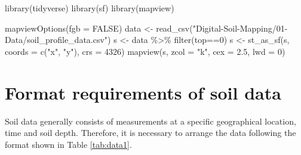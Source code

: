 \documentclass[
  10pt,
  b5paper,
  oneside]{book}
\newenvironment{Shaded}{\begin{snugshade}}{\end{snugshade}}
\newcommand{\AttributeTok}[1]{\textcolor[rgb]{0.77,0.63,0.00}{#1}}
\newcommand{\ConstantTok}[1]{\textcolor[rgb]{0.00,0.00,0.00}{#1}}
\newcommand{\DecValTok}[1]{\textcolor[rgb]{0.00,0.00,0.81}{#1}}
\newcommand{\FloatTok}[1]{\textcolor[rgb]{0.00,0.00,0.81}{#1}}
\newcommand{\FunctionTok}[1]{\textcolor[rgb]{0.00,0.00,0.00}{#1}}
\newcommand{\NormalTok}[1]{#1}
\newcommand{\OtherTok}[1]{\textcolor[rgb]{0.56,0.35,0.01}{#1}}
\newcommand{\SpecialCharTok}[1]{\textcolor[rgb]{0.00,0.00,0.00}{#1}}
\newcommand{\StringTok}[1]{\textcolor[rgb]{0.31,0.60,0.02}{#1}}
\begin{document}
\begin{Shaded}
\begin{Highlighting}[]
\FunctionTok{library}\NormalTok{(tidyverse)}
\FunctionTok{library}\NormalTok{(sf)}
\FunctionTok{library}\NormalTok{(mapview)}

\FunctionTok{mapviewOptions}\NormalTok{(}\AttributeTok{fgb =} \ConstantTok{FALSE}\NormalTok{)}
\NormalTok{data }\OtherTok{\textless{}{-}} 
  \FunctionTok{read\_csv}\NormalTok{(}\StringTok{"Digital{-}Soil{-}Mapping/01{-}Data/soil\_profile\_data.csv"}\NormalTok{)}
\NormalTok{s }\OtherTok{\textless{}{-}}\NormalTok{ data }\SpecialCharTok{\%\textgreater{}\%} \FunctionTok{filter}\NormalTok{(top}\SpecialCharTok{==}\DecValTok{0}\NormalTok{)}
\NormalTok{s }\OtherTok{\textless{}{-}} \FunctionTok{st\_as\_sf}\NormalTok{(s, }\AttributeTok{coords =} \FunctionTok{c}\NormalTok{(}\StringTok{"x"}\NormalTok{, }\StringTok{"y"}\NormalTok{), }\AttributeTok{crs =} \DecValTok{4326}\NormalTok{)}
\FunctionTok{mapview}\NormalTok{(s, }\AttributeTok{zcol =} \StringTok{"k"}\NormalTok{, }\AttributeTok{cex =} \FloatTok{2.5}\NormalTok{, }\AttributeTok{lwd =} \DecValTok{0}\NormalTok{)}
\end{Highlighting}
\end{Shaded}

\hypertarget{preproc}{%
\section{Format requirements of soil data}\label{preproc}}

Soil data generally consists of measurements at a specific geographical location, time and soil depth. Therefore, it is necessary to arrange the data following the format shown in Table \ref{tab:data1}.
\end{document}
